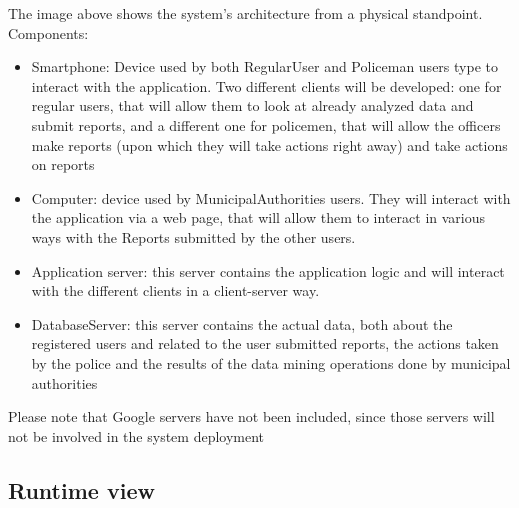 The image above shows the system's architecture from a physical standpoint.
Components:
\begin{itemize}
\item Smartphone: Device used by both RegularUser and Policeman users type to interact with the application. Two different clients will be developed: one for regular users, that will allow them to look at already analyzed data and submit reports, and a different one for policemen, that will allow the officers make reports (upon which they will take actions right away) and take actions on reports
\item Computer: device used by MunicipalAuthorities users. They will interact with the application via a web page, that will allow them to interact in various ways with the Reports submitted by the other users.
\item Application server: this server contains the application logic and will interact with the different clients in a client-server way.
\item DatabaseServer: this server contains the actual data, both about the registered users and related to the user submitted reports, the actions taken by the police and the results of the data mining operations done by municipal authorities
\end{itemize}
Please note that Google servers have not been included, since those servers will not be involved in the system deployment
\newpage
\subsection{Runtime view}

